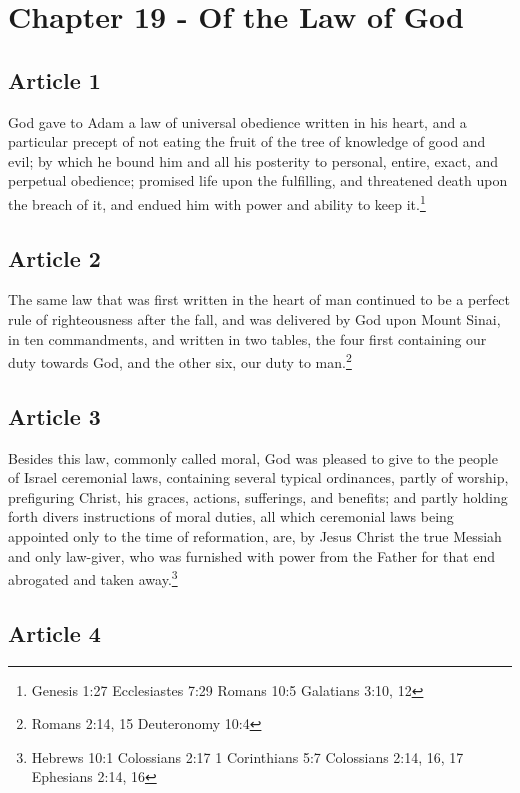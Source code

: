\documentclass[12pt,letterpaper]{book}
\begin{document}
\chapter{Chapter 19 - Of the Law of God}
\section{Article 1}

God gave to Adam a law of universal obedience written in his heart, and a particular precept of not eating the fruit of the tree of knowledge of good and evil; by which he bound him and all his posterity to personal, entire, exact, and perpetual obedience; promised life upon the fulfilling, and threatened death upon the breach of it, and endued him with power and ability to keep it.\footnote{Genesis 1:27 Ecclesiastes 7:29 Romans 10:5 Galatians 3:10, 12}

\section{Article 2}

The same law that was first written in the heart of man continued to be a perfect rule of righteousness after the fall, and was delivered by God upon Mount Sinai, in ten commandments, and written in two tables, the four first containing our duty towards God, and the other six, our duty to man.\footnote{Romans 2:14, 15 Deuteronomy 10:4}

\section{Article 3}

Besides this law, commonly called moral, God was pleased to give to the people of Israel ceremonial laws, containing several typical ordinances, partly of worship, prefiguring Christ, his graces, actions, sufferings, and benefits; and partly holding forth divers instructions of moral duties, all which ceremonial laws being appointed only to the time of reformation, are, by Jesus Christ the true Messiah and only law-giver, who was furnished with power from the Father for that end abrogated and taken away.\footnote{Hebrews 10:1 Colossians 2:17 1 Corinthians 5:7 Colossians 2:14, 16, 17 Ephesians 2:14, 16}

\section{Article 4}
\end{document}
